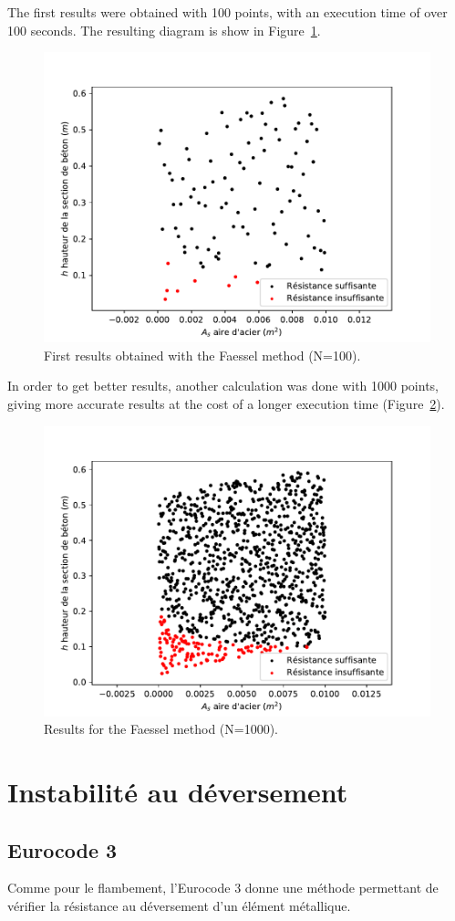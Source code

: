 \documentclass{report}
\begin{document}
The first results were obtained with 100 points, with an execution time of over 100 seconds. The resulting diagram is show in Figure~\ref{fig:faessel2}.

\begin{figure}[t]
  \centering
  \includegraphics[width=.6\linewidth]{fig/faessel2}
  \caption{First results obtained with the Faessel method (N=100).}\label{fig:faessel2}
\end{figure}

In order to get better results, another calculation was done with \num{1000} points, giving more accurate results at the cost of a longer execution time (Figure~\ref{fig:faessel3}).

\begin{figure}[t]
  \centering
  \includegraphics[width=.6\linewidth]{fig/faessel3}
  \caption{Results for the Faessel method (N=1000).}\label{fig:faessel3}
\end{figure}

\section{Instabilité au déversement}
\subsection{Eurocode 3}
Comme pour le flambement, l'Eurocode 3 donne une méthode permettant de vérifier la résistance au déversement d'un élément métallique.
\end{document}
